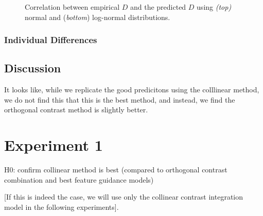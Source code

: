 \documentclass[smallextended]{svjour3}       %
\begin{document}
\begin{figure}
\centering
{}
\caption{Correlation between empirical $D$ and the predicted $D$ using \textit{(top)} normal and (\textit{bottom}) log-normal distributions.}
\label{fig:buetti2019_D}
\end{figure}



\subsubsection{Individual Differences}


\subsection{Discussion}

It looks like, while we replicate the good predicitons using the colllinear method, we do not find this that this is the best method, and instead, we find the orthogonal contrast method is slightly better. 


\section{Experiment 1}

H0: confirm collinear method is best (compared to orthogonal contrast combination and best feature guidance models)

[If this is indeed the case, we will use only the collinear contrast integration model in the following experiments].
\end{document}
